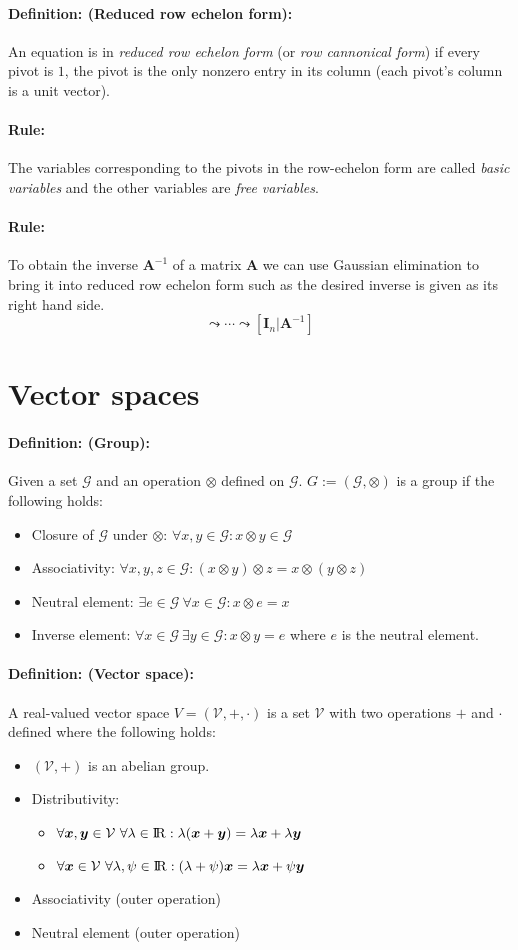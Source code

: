 \documentclass[12pt]{article}
\newcommand{\R}{{\rm I\!R}}
\newcommand{\A}{{\bm{A}}}
\newcommand{\xdefinition}[2]{\paragraph{\colorbox{#1!30}{\textbf{Definition:}} (#2):}}
\newcommand{\xrule}[1]{\paragraph{\colorbox{#1!30}{\textbf{Rule:}}}}
\newcommand{\mc}[1]{\mathcal{#1}}
\begin{document}
\xdefinition{green}{Reduced row echelon form} An equation is in \textit{reduced row echelon form} (or \textit{row cannonical form}) if every pivot is $1$, the pivot is the only nonzero entry in its column (each pivot's column is a unit vector).

\xrule{green} The variables corresponding to the pivots in the row-echelon form are called \textit{basic variables} and the other variables are \textit{free variables}.

\xrule{green} To obtain the inverse $\A^{-1}$ of a matrix $\A$ we can use Gaussian elimination to bring it into reduced row echelon form such as the desired inverse is given as its right hand side.
% 
\begin{equation}
	[\bm{A}|\bm{I}_n] \leadsto \cdots \leadsto [\bm{I}_n|\bm{A}^{-1}]
\end{equation}

\section{Vector spaces}

\xdefinition{green}{Group} Given a set $\mc{G}$ and an operation $\otimes$ defined on $\mc{G}$. $G := (\mc{G}, \otimes)$ is a group if the following holds:
%
\begin{itemize}
	\item Closure of $\mc{G}$ under $\otimes$: $\forall x, y \in \mc{G} : x \otimes y \in \mc{G}$
	\item Associativity: $\forall x, y, z \in \mc{G} : (x \otimes y) \otimes z = x \otimes (	y \otimes z)$
	\item Neutral element: $\exists e \in \mc{G} \ \forall x \in \mc{G} : x \otimes e = x$
	\item Inverse element: $\forall x \in \mc{G} \ \exists y \in \mc{G}: x \otimes y = e$ where $e$ is the neutral element.
\end{itemize}

\xdefinition{green}{Vector space} A real-valued vector space $V = (\mc{V}, +, \cdot)$ is a set $\mc{V}$ with two operations $+$ and $\cdot$ defined where the following holds:
%
\begin{itemize}
	\item $(\mc{V}, +)$ is an abelian group.
	\item Distributivity:
	\begin{itemize}
	\item $\forall \bm{x}, \bm{y} \in \mc{V} \ \forall \lambda \in \R : \lambda(\bm{x} + \bm{y}) = \lambda \bm{x} + \lambda \bm{y}$
	\item $\forall \bm{x} \in \mc{V} \ \forall \lambda, \psi \in \R : (\lambda + \psi) \bm{x} = \lambda \bm{x} + \psi \bm{y}$
	\end{itemize}
	\item Associativity (outer operation)
	\item Neutral element (outer operation)
\end{itemize}
\end{document}
